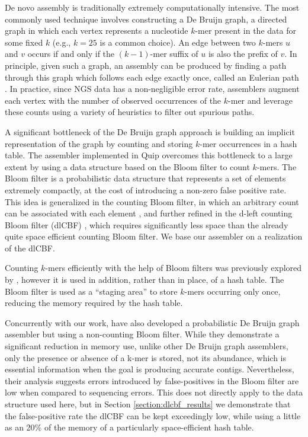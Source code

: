 \documentclass[twocolumn]{article}
\begin{document}

De novo assembly is traditionally extremely computationally intensive. The
most commonly used technique involves constructing a De Bruijn graph, a
directed graph in which each vertex represents a nucleotide $k$-mer present in
the data for some fixed $k$ (e.g., $k = 25$ is a common choice). An edge
between two $k$-mers $u$ and $v$ occurs if and only if the $(k-1)$-mer suffix
of $u$ is also the prefix of $v$. In principle, given such a graph, an
assembly can be produced by finding a path through this graph which follows
each edge exactly once, called an Eulerian path \citep{Pevzner2001}. In
practice, since NGS data has a non-negligible error rate, assemblers augment
each vertex with the number of observed occurrences of the $k$-mer and
leverage these counts using a variety of heuristics to filter out spurious
paths.

A significant bottleneck of the De Bruijn graph approach is building an
implicit representation of the graph by counting and storing $k$-mer
occurrences in a hash table. The assembler implemented in Quip overcomes this
bottleneck to a large extent by using a data structure based on the Bloom
filter to count $k$-mers. The Bloom filter \citep{Bloom1970} is a
probabilistic data structure that represents a set of elements extremely
compactly, at the cost of introducing a non-zero false positive rate. This
idea is generalized in the counting Bloom filter, in which an arbitrary count
can be associated with each element \citep{Fan2000}, and further refined in
the d-left counting Bloom filter (dlCBF) \citep{Bonomi2006}, which requires
significantly less space than the already quite space efficient counting Bloom
filter. We base our assembler on a realization of the dlCBF.

Counting $k$-mers efficiently with the help of Bloom filters was previously
explored by \citet{Melsted2011}, however it is used in addition, rather than
in place, of a hash table. The Bloom filter is used as a ``staging area'' to
store $k$-mers occurring only once, reducing the memory required by the hash
table. 

Concurrently with our work, \citet{Pell2011} have also developed a
probabilistic De Bruijn graph assembler but using a non-counting Bloom
filter. While they demonstrate a significant reduction in memory use, unlike
other De Bruijn graph assemblers, only the presence or absence of a k-mer is
stored, not its abundance, which is essential information when the goal is
producing accurate contigs. Nevertheless, their analysis suggests errors
introduced by false-positives in the Bloom filter are low when compared to
sequencing errors. This does not directly apply to the data structure used
here, but in Section \ref{section:dlcbf_results} we demonstrate that the
false-positive rate the dlCBF can be kept exceedingly low, while using a
little as an 20\% of the memory of a particularly space-efficient hash table.
\end{document}

